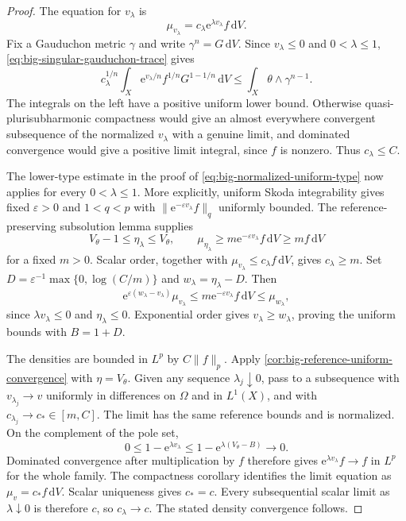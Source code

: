 \begin{proof}
The equation for $v_\lambda$ is
\[
 \mu_{v_\lambda}=c_\lambda\mathrm{e}^{\lambda v_\lambda}
                         f\,\mathrm{d}V.
\]
Fix a Gauduchon metric $\gamma$ and write
$\gamma^n=G\,\mathrm{d}V$. Since $v_\lambda\leq0$ and
$0<\lambda\leq1$, \eqref{eq:big-singular-gauduchon-trace} gives
\[
 c_\lambda^{1/n}
 \int_X\mathrm{e}^{v_\lambda/n}f^{1/n}G^{1-1/n}\,\mathrm{d}V
 \leq\int_X\theta\wedge\gamma^{n-1}.
\]
The integrals on the left have a positive uniform lower bound.
Otherwise quasi-plurisubharmonic compactness would give an almost
everywhere convergent subsequence of the normalized $v_\lambda$ with a
genuine limit, and dominated convergence would give a positive limit
integral, since $f$ is nonzero. Thus $c_\lambda\leq C$.

The lower-type estimate in the proof of
\eqref{eq:big-normalized-uniform-type} now applies for every
$0<\lambda\leq1$. More explicitly, uniform Skoda integrability gives
fixed $\varepsilon>0$ and $1<q<p$ with
$\|\mathrm{e}^{-\varepsilon v_\lambda}f\|_q$ uniformly bounded.
The reference-preserving subsolution lemma supplies
\[
 V_\theta-1\leq\eta_\lambda\leq V_\theta,
 \qquad \mu_{\eta_\lambda}\geq
 m\mathrm{e}^{-\varepsilon v_\lambda}f\,\mathrm{d}V
 \geq mf\,\mathrm{d}V
\]
for a fixed $m>0$. Scalar order, together with
$\mu_{v_\lambda}\leq c_\lambda f\,\mathrm{d}V$, gives
$c_\lambda\geq m$. Set
$D=\varepsilon^{-1}\max\{0,\log(C/m)\}$ and
$w_\lambda=\eta_\lambda-D$. Then
\[
 \mathrm{e}^{\varepsilon(w_\lambda-v_\lambda)}\mu_{v_\lambda}
 \leq m\mathrm{e}^{-\varepsilon v_\lambda}f\,\mathrm{d}V
 \leq\mu_{w_\lambda},
\]
since $\lambda v_\lambda\leq0$ and $\eta_\lambda\leq0$.
Exponential order gives $v_\lambda\geq w_\lambda$, proving the uniform
bounds with $B=1+D$.

The densities are bounded in $L^p$ by $C\|f\|_p$. Apply
\cref{cor:big-reference-uniform-convergence} with $\eta=V_\theta$.
Given any sequence $\lambda_j\downarrow0$, pass to a subsequence with
$v_{\lambda_j}\to v$ uniformly in differences on $\Omega$ and in
$L^1(X)$, and with $c_{\lambda_j}\to c_*\in[m,C]$.
The limit has the same reference bounds and is normalized. On the
complement of the pole set,
\[
 0\leq1-\mathrm{e}^{\lambda v_\lambda}
 \leq1-\mathrm{e}^{\lambda(V_\theta-B)}\longrightarrow0.
\]
Dominated convergence after multiplication by $f$ therefore gives
$\mathrm{e}^{\lambda v_\lambda}f\to f$ in $L^p$ for the whole family.
The compactness corollary identifies the limit equation as
$\mu_v=c_*f\,\mathrm{d}V$. Scalar uniqueness gives $c_*=c$.
Every subsequential scalar limit as $\lambda\downarrow0$ is therefore $c$, so
$c_\lambda\to c$. The stated density convergence follows.


\end{proof}
